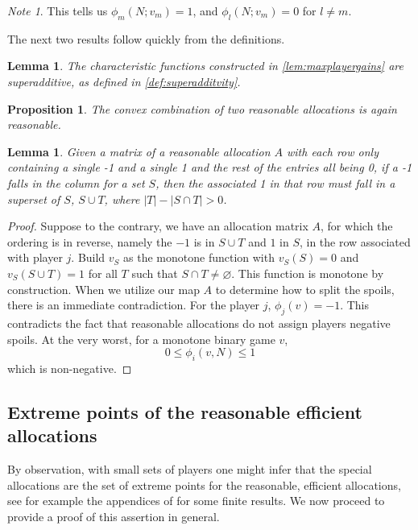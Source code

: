 \documentclass[12pt,letterpaper,final]{article}
\theoremstyle{plain}
\theoremstyle{plain}
\newtheorem{proposition}[theorem]{Proposition}
\theoremstyle{plain}
\newtheorem{lemma}[theorem]{Lemma}
\theoremstyle{plain}
\theoremstyle{plain}
\theoremstyle{plain}
\theoremstyle{plain}
\theoremstyle{definition}
\theoremstyle{definition}
\theoremstyle{definition}
\theoremstyle{definition}
\theoremstyle{definition}
\theoremstyle{remark}
\theoremstyle{remark}
\newtheorem*{note}{Note}
\theoremstyle{remark}
\theoremstyle{remark}
\begin{document}
\begin{note}
  This tells us
  \(\phi_m(N;v_m) = 1\), and \(\phi_l(N;v_m) = 0\) for \(l \neq m\).
\end{note}

The next two results follow quickly from the definitions.

\begin{lemma}\label{lem:charFuncSuperadd}
  The characteristic functions constructed in
  \cref{lem:maxplayergains} are %
  superadditive, as
  defined in \cref{def:superadditvity}.%
\end{lemma}

  


\begin{proposition}\label{prop:convexComboMaps}
  The convex combination of two reasonable allocations is again
  reasonable.
\end{proposition}


\begin{lemma}\label{lem:order1s}
  Given a matrix of a reasonable allocation \(A\) with each row
  only containing a single -1 and a single
  1 and the rest of the entries all being 0, if a -1 falls in the
  column for a set \(S\), then the associated 1 in that row must fall
  in a superset of \(S\), \(S \cup T\), where \(|T|-|S\cap T| > 0\).
\end{lemma}

\begin{proof}
  Suppose to the contrary, we have an allocation matrix \(A\), for
  which the 
  ordering is in reverse, namely the \(-1\) is in \(S\cup T\) and
  \(1\) in \(S\), in the row associated with player \(j\).
  Build \(v_S\) as the monotone function
  with \(v_S(S) = 0\) and \(v_S(S \cup T) = 1\) for all \(T\) such
  that  \(S \cap T \neq \varnothing\). This function is
  monotone by construction. When we utilize our map \(A\) to
  determine how to split the spoils, there is an immediate
  contradiction. For the player \(j\), \(\phi_j(v) = -1\). This
  contradicts the fact that reasonable allocations do not assign 
  players 
  negative spoils. At the very worst, for a monotone binary game \(v\),
  \[
    0\leq \phi_i(v,N)\leq 1 
  \]
  which is non-negative.
\end{proof}

\subsection{Extreme points of the reasonable efficient allocations}
By observation, with small sets of players one might infer that the
special allocations are the set of extreme points for the reasonable,
efficient allocations, see for example the appendices of \cite{ClarkDis}
for some finite results. We now
proceed to provide a proof of this assertion in general.
\end{document}
